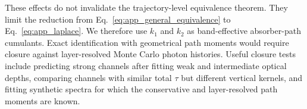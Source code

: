 These effects do not invalidate the trajectory-level equivalence theorem.
They limit the reduction from Eq.~\eqref{eq:app_general_equivalence} to
Eq.~\eqref{eq:app_laplace}.  We therefore use $k_1$ and $k_2$ as
band-effective absorber-path cumulants.  Exact identification with geometrical
path moments would require closure against layer-resolved Monte Carlo photon
histories.  Useful closure tests include predicting strong channels after
fitting weak and intermediate optical depths, comparing channels with similar
total $\tau$ but different vertical kernels, and fitting synthetic spectra for
which the conservative and layer-resolved path moments are known.
